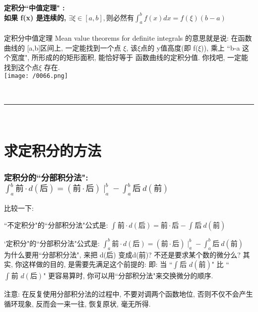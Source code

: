 \documentclass[UTF8]{ctexart}
\begin{document}
	
	
	\subsection{定积分``中值定理" : \\
		如果 f(x) 是连续的, $ \exists \xi  \in [a,b], \text{则必然有}\int_a^b{f(x)dx=f(\xi)(b-a)}$}
	
	定积分中值定理 Mean value theorems for definite integrals 的意思就是说: 在函数曲线的 [a,b]区间上, 一定能找到一个点 $\xi$, 该$\xi$点的 y值高度(即 f($\xi$)), 乘上 ``b-a 这个宽度", 所形成的的矩形面积, 能恰好等于 函数曲线的定积分值.  你找吧, 一定能找到这个点$\xi$ 存在. \\
	
	\texttt{[image: /0066.png]}
	
	
	~\\
	\hrule
	~\\
	
	\part{求定积分的方法}
	
	
	\section{定积分的``分部积分法": $\int_a^b{\text{前}\cdot d(\text{后})}=\left( \text{前}\cdot \text{后} \right) \mid_{a}^{b}-\int_a^b{\text{后}}\ d(\text{前})$}
	
	比较一下: 
	
	``不定积分"的``分部积分法"公式是: $\boxed{\int_{}^{}{\text{前}\cdot d(\text{后})}=\text{前}\cdot \text{后}-\int_{}^{}{\text{后}}\ d(\text{前})}	$
	
	`定积分"的``分部积分法"公式是: $\boxed{\int_a^b{\text{前}\cdot d(\text{后})}=\left( \text{前}\cdot \text{后} \right) \mid_{a}^{b}-\int_a^b{\text{后}}\ d(\text{前})}	$ \\
	
	为什么要用``分部积分法", 来把 d(后) 变成d(前)? 不还是要求某个数的微分么? 其实, 你这样做的目的, 是需要先满足这个前提的: 即: 
	当 ``$\int_{}^{}{\text{后\ }d\left( \text{前} \right)}$" 比 ``$\int_{}^{}{\text{前\ }d\left( \text{后} \right)}$" 更容易算时, 你可以用``分部积分法"来交换微分的顺序.
	
	注意: 在反复使用分部积分法的过程中, 不要对调两个函数地位, 否则不仅不会产生循环现象, 反而会一来一往, 恢复原状, 毫无所得.
	
	
	
\end{document}
